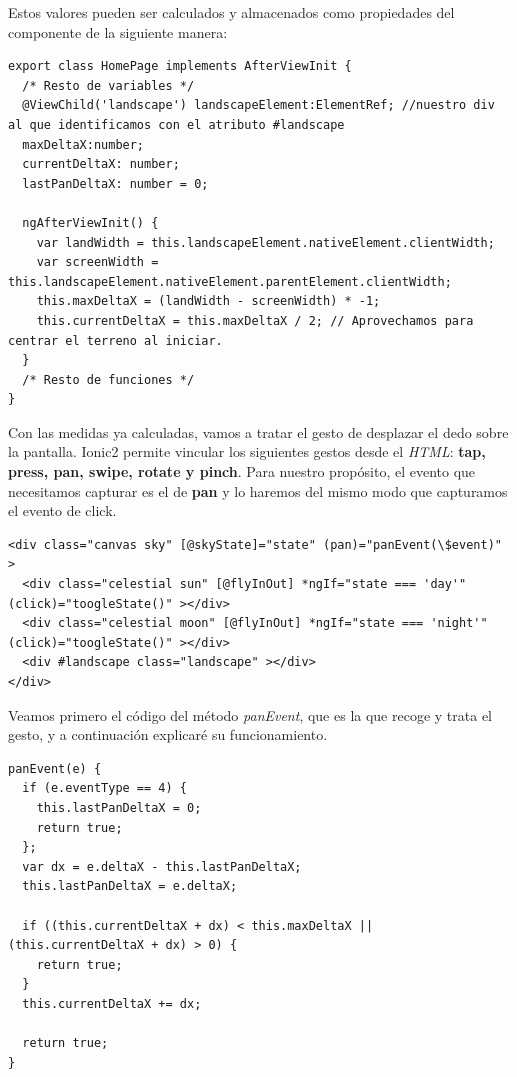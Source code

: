 Estos valores pueden ser calculados y almacenados como propiedades del componente de la siguiente manera:

{\begin{lstlisting}[style=htmlcssjs,frame=tlrb, xleftmargin={0.2cm}]
export class HomePage implements AfterViewInit {
  /* Resto de variables */
  @ViewChild('landscape') landscapeElement:ElementRef; //nuestro div al que identificamos con el atributo #landscape
  maxDeltaX:number;
  currentDeltaX: number;
  lastPanDeltaX: number = 0;

  ngAfterViewInit() {
    var landWidth = this.landscapeElement.nativeElement.clientWidth;
    var screenWidth = this.landscapeElement.nativeElement.parentElement.clientWidth;
    this.maxDeltaX = (landWidth - screenWidth) * -1;
    this.currentDeltaX = this.maxDeltaX / 2; // Aprovechamos para centrar el terreno al iniciar.
  }
  /* Resto de funciones */
}
\end{lstlisting}}


Con las medidas ya calculadas, vamos a tratar el gesto de desplazar el dedo sobre la pantalla. Ionic2 permite vincular los siguientes gestos desde el \emph{HTML}: \textbf{tap, press, pan, swipe, rotate y pinch}. Para nuestro propósito, el evento que necesitamos capturar es el de \textbf{pan} y lo haremos del mismo modo que capturamos el evento de click.

{\begin{lstlisting}[style=htmlcssjs,frame=tlrb, xleftmargin={0.2cm}]
<div class="canvas sky" [@skyState]="state" (pan)="panEvent(\$event)" >
  <div class="celestial sun" [@flyInOut] *ngIf="state === 'day'" (click)="toogleState()" ></div>
  <div class="celestial moon" [@flyInOut] *ngIf="state === 'night'" (click)="toogleState()" ></div>
  <div #landscape class="landscape" ></div>
</div>
\end{lstlisting}}

Veamos primero el código del método \emph{panEvent}, que es la que recoge y trata el gesto, y a continuación explicaré su funcionamiento.

{\begin{lstlisting}[style=htmlcssjs,frame=tlrb, xleftmargin={0.2cm}]
panEvent(e) {
  if (e.eventType == 4) {
    this.lastPanDeltaX = 0;
    return true;
  };
  var dx = e.deltaX - this.lastPanDeltaX;
  this.lastPanDeltaX = e.deltaX;

  if ((this.currentDeltaX + dx) < this.maxDeltaX || (this.currentDeltaX + dx) > 0) {
    return true;
  }
  this.currentDeltaX += dx;

  return true;
}
\end{lstlisting}}

